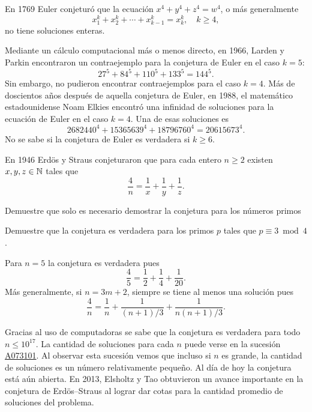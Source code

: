 \begin{example}
En 1769 Euler conjeturó que la ecuación 
$x^4+y^4+z^4=w^4$,
o más generalmente 
\[
	x_1^k+x_2^k+\cdots+x_{k-1}^k=x_k^k,\quad
	k\geq4,
\]
no tiene soluciones enteras. 

Mediante un cálculo computacional más o menos directo, en 1966, Larden y Parkin
encontraron un contraejemplo para la conjetura de Euler en el caso $k=5$: 
\[
	27^5+84^5+110^5+133^5=144^5.
\]
Sin embargo, no pudieron encontrar contraejemplos para el caso $k=4$.  Más de
doscientos años después de aquella conjetura de Euler, en 1988, el matemático
estadounidense Noam Elkies encontró una infinidad de soluciones para la
ecuación de Euler en el caso $k=4$. Una de esas soluciones es 
\[
	2682440^4+15365639^4+18796760^4=20615673^4.
\]
No se sabe si la conjetura de Euler es verdadera si $k\geq6$. 

\end{example}

\begin{example}
En 1946 Erd\"os y Straus conjeturaron que para cada entero $n\geq2$ existen
$x,y,z\in\mathbb{N}$ tales que 
\[
	\frac4n=\frac1x+\frac1y+\frac1z.
\]

\begin{exercise}
	Demuestre que solo es necesario demostrar la conjetura para los números primos
\end{exercise}

\begin{exercise}
	Demuestre que la conjetura es verdadera para los primos $p$ tales que
	$p\equiv3\bmod 4$. 
\end{exercise}

Para $n=5$ la conjetura es verdadera pues 
\[
	\frac45=\frac12+\frac14+\frac1{20}.
\]
Más generalmente, si $n=3m+2$, siempre se tiene al menos una solución pues 
\[
	\frac4n=\frac1n+\frac{1}{(n+1)/3}+\frac{1}{n(n+1)/3}.
\]

Gracias al uso de computadoras se sabe que la conjetura es verdadera para todo
$n\leq10^{17}$.  La cantidad de soluciones para cada $n$ puede verse en la
sucesión \href{https://oeis.org/A073101}{A073101}. Al observar esta sucesión vemos que incluso si $n$ es
grande, la cantidad de soluciones es un número relativamente pequeño.  Al día
de hoy la conjetura está aún abierta. En 2013, Elsholtz y Tao obtuvieron un
avance importante en la conjetura de Erd\"os--Straus al lograr dar cotas para
la cantidad promedio de soluciones del problema. 
\end{example}


